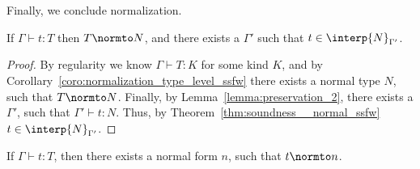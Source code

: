 \noindent
Finally, we conclude normalization.
\begin{thm}
  If $\Gamma \vdash t:T$ then $T \normto N$, and there exists a $\Gamma'$ such that $t \in \interp{N}_{\Gamma'}$.
  \label{thm:soundness_term_ssfw}
\end{thm}
\begin{proof}
  By regularity we know $\Gamma \vdash T:K$ for some kind $K$, and
  by Corollary~\ref{coro:normalization_type_level_ssfw} there exists a
  normal type $N$, such that $T \normto N$.  Finally, by
  Lemma~\ref{lemma:preservation_2}, there exists a $\Gamma'$, such
  that $\Gamma' \vdash t:N$.  Thus, by
  Theorem~\ref{thm:soundness__normal_ssfw} $t \in \interp{N}_{\Gamma'}$.
\end{proof}

\begin{corollary}[Normalization]
  If $\Gamma \vdash t:T$, then there exists a normal form $n$, such
  that $t \normto n$.
\end{corollary}

